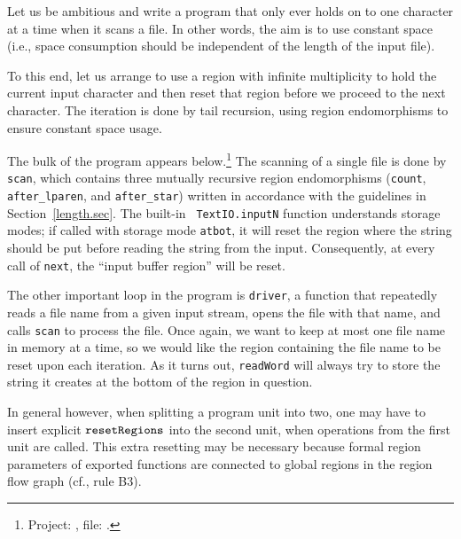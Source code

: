 \documentclass[12pt]{book}
\begin{document}
Let us be ambitious and write a program that only ever holds on to one character at a
time when it scans a file. In other words, the aim is to use constant space (i.e., space
consumption should be independent of the length of the input file).

To this end, let us arrange to use a region with infinite multiplicity to
hold the current input character and then reset that region before we proceed
to the next character. The iteration is done by tail recursion, using region
endomorphisms to ensure constant space usage.

The bulk of the program appears below.\footnote{Project:
  , file: .} The
scanning of a single file is done by {\tt scan}, which contains three
mutually recursive region endomorphisms ({\tt count}, {\tt
  after\_lparen}, and {\tt after\_star}) written in accordance with
the guidelines in Section~\ref{length.sec}. The built-in {\tt
  TextIO.inputN} function understands storage modes; if called with
storage mode {\tt atbot}, it will reset the region where the string
should be put before reading the string from the input.  Consequently,
at every call of {\tt next}, the ``input buffer region'' will be
reset.

The other important loop in the program is {\tt driver}, a function that
repeatedly reads a file name from a given input stream, opens the file
with that name, and calls {\tt scan} to process the file. Once again, we
want to keep at most one file name in memory at a time, so we would like
the region containing the file name to be reset upon each iteration.
As it turns out, {\tt readWord} will always try to store the string it
creates at the bottom of the region in question. 

In general however, when splitting a program unit into two, one may have to
insert explicit $\hbox{\tt resetRegions}$ into the second unit, when operations from
the first unit are called. This extra resetting may be necessary
because formal region parameters of exported functions are connected
to global regions in the region flow graph (cf., rule B3).
\end{document}
